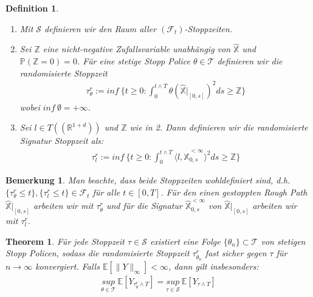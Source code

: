 \documentclass[12pt,titlepage,headsepline]{article}
\newtheorem{definition}{Definition}[section]
\newtheorem{theorem}{Theorem}[section]
\newtheorem*{bemerkung*}{Bemerkung}
\begin{document}
      \begin{definition} \
        \begin{enumerate}
          \item Mit $\mathcal{S}$ definieren wir den Raum aller $(\mathcal{F}_t)$-Stoppzeiten.
          \item Sei $\mathbb{Z}$ eine nicht-negative Zufallsvariable unabhängig von $\hat{\mathbb{X}}$ und $\mathbb{P}(\mathbb{Z}=0)=0$. Für eine stetige Stopp Police $\theta \in \mathcal{T}$ definieren wir die randomisierte Stoppzeit
          \begin{align}
            \tau^{r}_{\theta} := inf \ \bigg\{t\geq0 : \int^{t\land T}_{0}\theta(\hat{\mathbb{X}}\lvert_{[0,s]})^2ds\geq \mathbb{Z}\bigg\}
          \end{align}
          wobei $inf \ \emptyset = +\infty$.
          \item Sei $l \in T((\mathbb{R}^{1+d}))$ und $\mathbb{Z}$ wie in 2. Dann definieren wir die randomisierte Signatur Stoppzeit als:
          \begin{align}
            \tau^{r}_{l} := inf \ \bigg\{t\geq0 : \int^{t\land T}_{0}\langle l ,\hat{\mathbb{X}}^{<\infty}_{0,s}\rangle^2ds\geq \mathbb{Z}\bigg\}
          \end{align}
        \end{enumerate}
      \end{definition}
      \begin{bemerkung*}
        \hfill\break
        \textup{
        Man beachte, dass beide Stoppzeiten wohldefiniert sind, d.h. $\{ \tau^{r}_{\theta} \leq t\}, \{ \tau^{r}_{l} \leq t \} \in \mathcal{F}_t$ für alle $t \in [0,T]$. Für den einen gestoppten Rough Path $\hat{\mathbb{X}}\lvert_{[0,s]}$ arbeiten wir mit $\tau^{r}_{\theta}$ und für die Signatur
        $\hat{\mathbb{X}}^{<\infty}_{0,s}$ von $\hat{\mathbb{X}}\lvert_{[0,s]}$ arbeiten wir mit $\tau^{r}_{l}$.
        }
      \end{bemerkung*}
      \begin{theorem}
        Für jede Stoppzeit $\tau \in \mathcal{S}$ existiert eine Folge $\{\theta_n\} \subset \mathcal{T}$ von stetigen Stopp Policen, sodass die randomisierte Stoppzeit $\tau^{r}_{\theta_n}$ fast sicher gegen $\tau$ für $n \rightarrow \infty$ konvergiert. Falls $\mathbb{E}[\lVert Y\rVert_\infty]<\infty$, dann gilt insbesonders:
        \begin{align*}
          \underset{\theta \in \mathcal{T}}{sup} \ \mathbb{E}[Y_{\tau^{r}_{\theta}\land T}] = \underset{\tau \in \mathcal{S}}{sup} \ \mathbb{E}[Y_{\tau \land T}]
        \end{align*}
      \end{theorem}
\end{document}
